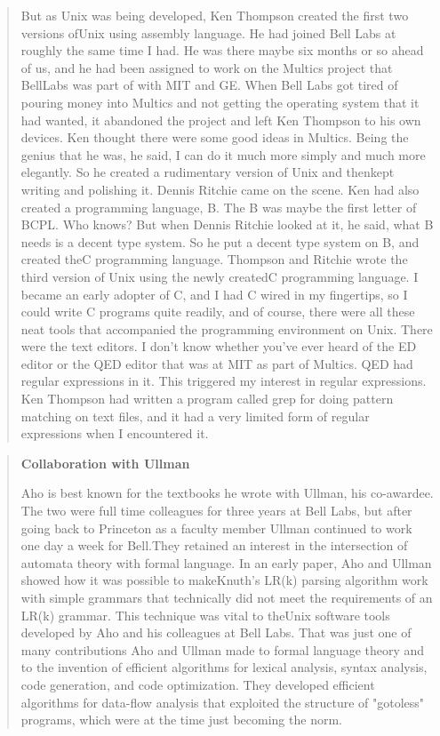 \begin{quotation}
    But as Unix was being developed, Ken Thompson created the first two versions ofUnix using 
assembly language. He had joined Bell Labs at roughly the same time I had. He was there maybe six 
months or so ahead of us, and he had been assigned to work on the Multics project that BellLabs was 
part of with MIT and GE. When Bell Labs got tired of pouring money into Multics and not getting the 
operating system that it had wanted, it abandoned the project and left Ken Thompson to his 
own devices. Ken thought there were some good ideas in Multics. Being the genius that he was, he 
said, I can do it much more simply and much more elegantly. So he created a rudimentary version of 
Unix and thenkept writing and polishing it. Dennis Ritchie came on the scene. Ken had also created 
a programming language, B. The B was maybe the first letter of BCPL. Who knows? But when Dennis 
Ritchie looked at it, he said, what B needs is a decent type system. So he put a decent type system 
on B, and created theC programming language. Thompson and Ritchie wrote the third version of Unix 
using the newly createdC programming language. I became an early adopter of C, and I had C wired in 
my fingertips, so I could write C programs quite readily, and of course, there were all these neat 
tools that accompanied the programming environment on Unix. There were the text editors. I don't 
know whether you've ever heard of the ED editor or the QED editor that was at MIT as part of 
Multics. QED had regular expressions in it. This triggered my interest in regular expressions. Ken 
Thompson had written a program called grep for doing pattern matching on text files, and it had a 
very limited form of regular expressions when I encountered it.
\cite{aho_oral_history_2022}
\end{quotation}
\begin{quotation}
\textbf{Collaboration with Ullman}

Aho is best known for the textbooks he wrote with Ullman, his co-awardee. 
The two were full time colleagues for three years at Bell Labs, but after 
going back to Princeton as a faculty member Ullman continued to work one day a 
week for Bell.They retained an interest in the intersection of automata theory 
with formal language. In an early paper, Aho and Ullman showed how it was 
possible to makeKnuth's LR(k) parsing algorithm work with simple grammars that 
technically did not meet the requirements of an LR(k) grammar. This technique 
was vital to theUnix software tools developed by Aho and his colleagues at Bell 
Labs. That was just one of many contributions Aho and Ullman made to formal 
language theory and to the invention of efficient algorithms for lexical 
analysis, syntax analysis, code generation, and code optimization. They 
developed efficient algorithms for data-flow analysis that exploited the 
structure of "gotoless" programs, which were at the time just becoming the norm.
\cite{aho_turing_award_2020}
\end{quotation}
